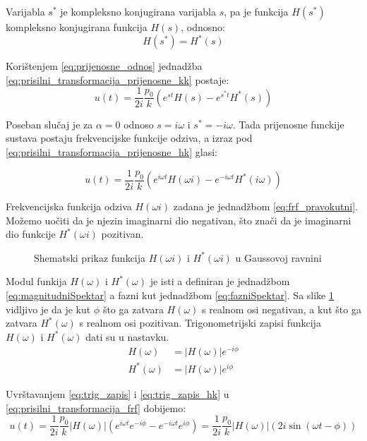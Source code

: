 Varijabla $s^*$ je kompleksno konjugirana varijabla $s$, pa je funkcija
$H(s^*)$ kompleksno konjugirana funkcija $H(s)$, odnosno:
\begin{equation}\label{eq:prijenosne_odnos}
    H(s^*)=H^*(s) 
\end{equation}

Korištenjem \eqref{eq:prijenosne_odnos} jednadžba \eqref{eq:prisilni_transformacija_prijenosne_kk}
postaje:
\begin{equation}\label{eq:prisilni_transformacija_prijenosne_hk}
    u(t)=\frac{1}{2i}\frac{p_0}{k} (e^{st}H(s)-e^{s^*t}H^*(s))
\end{equation}

Poseban slučaj je za $\alpha = 0$ odnoso $s=i\omega \text{ i } s^*=-i\omega$. Tada
prijenosne funckije sustava postaju frekvencijske funkcije odziva, a izraz pod
\eqref{eq:prisilni_transformacija_prijenosne_hk} glasi:

\begin{equation}\label{eq:prisilni_transformacija_frf}
    u(t) = \frac{1}{2i}\frac{p_0}{k}(e^{i\omega t}H(\omega i) - e^{-i\omega t}H^*(i\omega))
\end{equation}

Frekvencijska funkcija odziva $H(\omega i)$ zadana je jednadžbom \eqref{eq:frf_pravokutni}.
Možemo uočiti da je njezin imaginarni dio negativan, što znači da je imaginarni dio
funkcije $H^*(\omega i)$ pozitivan.
\begin{figure}[H]
    
    \caption{Shematski prikaz funkcija $H(\omega i) \text{ i }H^*(\omega i)$ u
    Gaussovoj ravnini}
    \label{fig:frf-gauss}
\end{figure}

Modul funkija $H(\omega)$ i $H^*(\omega)$ je isti a definiran je jednadžbom
\eqref{eq:magnitudniSpektar} a fazni kut jednadžbom \eqref{eq:fazniSpektar}. Sa
slike \ref{fig:frf-gauss} vidljivo je da je kut $\phi$ što ga zatvara $H(\omega)$ s
realnom osi negativan, a kut što ga zatvara $H^*(\omega)$ s realnom osi pozitivan.
Trigonometrijski zapisi funkcija $H(\omega) \text{ i } H^*(\omega)$ dati su u
nastavku.
\begin{align}
    H(\omega) &= |H(\omega)|e^{-i\phi} \label{eq:trig_zapis}\\
    H^*(\omega) &= |H(\omega)|e^{i\phi} \label{eq:trig_zapis_hk} %
\end{align}

Uvrštavanjem \eqref{eq:trig_zapis} i \eqref{eq:trig_zapis_hk} u \eqref{eq:prisilni_transformacija_frf}
dobijemo:
\begin{equation}
    u(t)=\frac{1}{2i}\frac{p_0}{k}|H(\omega)|(e^{i\omega t}e^{-i\phi}-e^{-i\omega t}e^{i\phi})
        =\frac{1}{2i}\frac{p_0}{k}|H(\omega)|(2i\sin(\omega t -\phi))
\end{equation}


